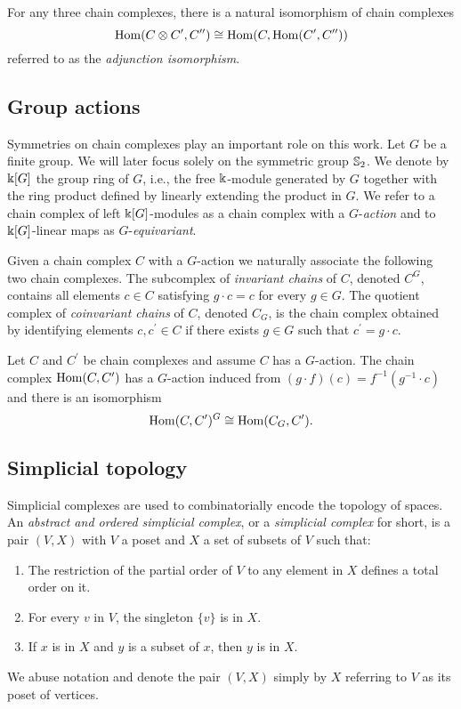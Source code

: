 For any three chain complexes, there is a natural isomorphism of chain complexes
\begin{equation} \label{e:adjunction isomorphism}
\Hom(C \otimes C^\prime, C^{\prime\prime}) \cong
\Hom(C, \Hom(C^\prime, C^{\prime\prime}))
\end{equation}
referred to as the \textit{adjunction isomorphism}.

\subsection{Group actions}

Symmetries on chain complexes play an important role on this work.
Let $G$ be a finite group.
We will later focus solely on the symmetric group $\S_2$.
We denote by $\k[G]$ the group ring of $G$, i.e., the free $\k$-module generated by $G$ together with the ring product defined by linearly extending the product in $G$.
We refer to a chain complex of left $\k[G]$-modules as a chain complex with a $G$-\textit{action} and to $\k[G]$-linear maps as $G$-\textit{equivariant}.

Given a chain complex $C$ with a $G$-action we naturally associate the following two chain complexes.
The subcomplex of \textit{invariant chains} of $C$, denoted $C^G$, contains all elements $c \in C$ satisfying $g \cdot c = c$ for every $g \in G$.
The quotient complex of \textit{coinvariant chains} of $C$, denoted $C_G$, is the chain complex obtained by identifying elements $c, c^\prime \in C$ if there exists $g \in G$ such that $c^\prime = g \cdot c$.

Let $C$ and $C^\prime$ be chain complexes and assume $C$ has a $G$-action.
The chain complex $\Hom(C, C^\prime)$ has a $G$-action induced from $(g \cdot f)(c) = f^{-1}(g^{-1} \cdot c)$ and there is an isomorphism
\begin{equation} \label{e:invariant hom iso hom coinvariants}
\Hom(C, C^\prime)^G \cong \Hom(C_G, C^\prime).
\end{equation}

\subsection{Simplicial topology}

Simplicial complexes are used to combinatorially encode the topology of spaces.
An \textit{abstract and ordered simplicial complex}, or a \textit{simplicial complex} for short, is a pair $(V, X)$ with $V$ a poset and $X$ a set of subsets of $V$ such that:
\begin{enumerate}
	\item The restriction of the partial order of $V$ to any element in $X$ defines a total order on it.
	\item For every $v$ in $V$, the singleton $\{v\}$ is in $X$.
	\item If $x$ is in $X$ and $y$ is a subset of $x$, then $y$ is in $X$.
\end{enumerate}
We abuse notation and denote the pair $(V, X)$ simply by $X$ referring to $V$ as its poset of vertices.

